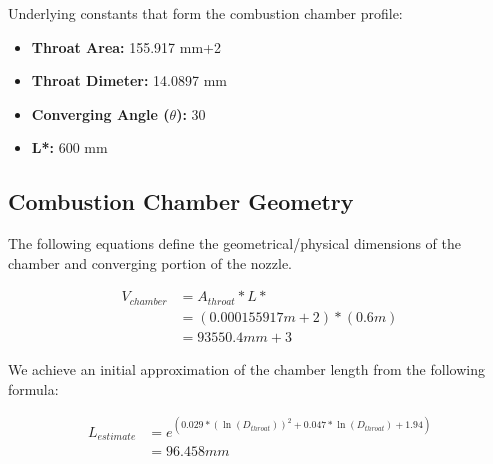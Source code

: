 \documentclass[12pt]{report}
\begin{document}
Underlying constants that form the combustion chamber profile:

\begin{itemize}
	\item \textbf{Throat Area: } 155.917 mm+2  
	\item \textbf{Throat Dimeter: } 14.0897 mm  
	\item \textbf{Converging Angle ($\theta$): } 30 \degree 
	\item \textbf{L*: } 600 mm  
\end{itemize}




\subsection{Combustion Chamber Geometry}

The following equations define the geometrical/physical dimensions of the chamber and converging portion of the nozzle.




\vspace{10 mm}

\begin{equation}
\begin{split}
\boldsymbol{\mathit{V_{chamber}}} & = \boldsymbol{\mathit{A_{throat}}} * \boldsymbol{\mathit{L*}}\\
 & = \left(0.000155917 m+2\right) * \left(0.6 m\right)\\
 & = 93550.4 mm+3 
\end{split}
\end{equation}


\vspace{10 mm}

We achieve an initial approximation of the chamber length from the following formula:



\vspace{6 mm}

\begin{equation}
\begin{split}
\boldsymbol{\mathit{L_{estimate}}} & = \mathit{e}^{\left(0.029 * {\left(\ln{\left(\boldsymbol{\mathit{D_{throat}}}\right)}\right)}^{2} + 0.047 * \ln{\left(\boldsymbol{\mathit{D_{throat}}}\right)} + 1.94\right)}\\
 & = 96.458 mm 
\end{split}
\end{equation}


\vspace{6 mm}
\end{document}
